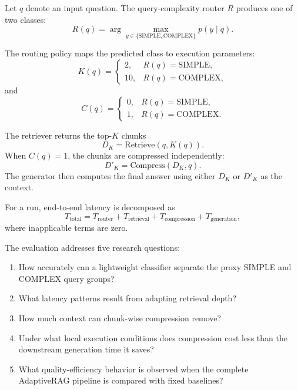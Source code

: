 \documentclass[conference]{IEEEtran}
\begin{document}
Let $q$ denote an input question. The query-complexity router $R$ produces one of two classes:
\begin{equation}
R(q)=\arg\max_{y\in\{\mathrm{SIMPLE},\mathrm{COMPLEX}\}} p(y\mid q).
\end{equation}

The routing policy maps the predicted class to execution parameters:
\begin{equation}
K(q)=
\begin{cases}
2, & R(q)=\mathrm{SIMPLE},\\
10, & R(q)=\mathrm{COMPLEX},
\end{cases}
\end{equation}
and
\begin{equation}
C(q)=
\begin{cases}
0, & R(q)=\mathrm{SIMPLE},\\
1, & R(q)=\mathrm{COMPLEX}.
\end{cases}
\end{equation}

The retriever returns the top-$K$ chunks
\begin{equation}
D_K=\mathrm{Retrieve}(q,K(q)).
\end{equation}
When $C(q)=1$, the chunks are compressed independently:
\begin{equation}
D'_K=\mathrm{Compress}(D_K,q).
\end{equation}
The generator then computes the final answer using either $D_K$ or $D'_K$ as the context.

For a run, end-to-end latency is decomposed as
\begin{equation}
T_{\mathrm{total}}=
T_{\mathrm{router}}+
T_{\mathrm{retrieval}}+
T_{\mathrm{compression}}+
T_{\mathrm{generation}},
\end{equation}
where inapplicable terms are zero.

The evaluation addresses five research questions:
\begin{enumerate}
    \item How accurately can a lightweight classifier separate the proxy SIMPLE and COMPLEX query groups?
    \item What latency patterns result from adapting retrieval depth?
    \item How much context can chunk-wise compression remove?
    \item Under what local execution conditions does compression cost less than the downstream generation time it saves?
    \item What quality-efficiency behavior is observed when the complete AdaptiveRAG pipeline is compared with fixed baselines?
\end{enumerate}
\end{document}

